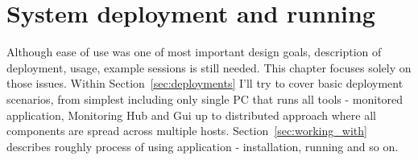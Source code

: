  
%


\chapter{System deployment and running}
\label{cha:deployment}

Although ease of use was one of most important design goals, description of deployment, usage, example sessions is still needed. This chapter focuses solely on those issues. Within Section~\ref{sec:deployments} I\rq{}ll try to cover basic deployment scenarios, from simplest including only single PC that runs all tools - monitored application, Monitoring Hub and Gui up to distributed approach where all components are spread across multiple hosts. Section~\ref{sec:working_with} describes roughly process of using application - installation, running and so on.









